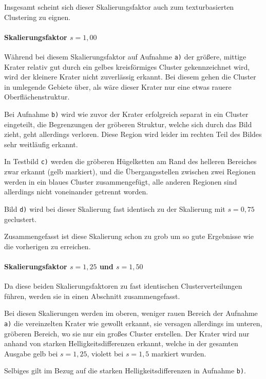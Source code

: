 Insgesamt scheint sich dieser Skalierungsfaktor auch zum texturbasierten Clustering zu eignen.

\paragraph{Skalierungsfaktor $s=1,00$}

Während bei diesem Skalierungsfaktor auf Aufnahme \texttt{a)} der größere, mittige Krater relativ gut durch ein gelbes kreisförmiges Cluster gekennzeichnet wird, wird der kleinere Krater nicht zuverlässig erkannt. Bei diesem gehen die Cluster in umlegende Gebiete über, als wäre dieser Krater nur eine etwas rauere Oberflächenstruktur.

Bei Aufnahme \texttt{b)} wird wie zuvor der Krater erfolgreich separat in ein Cluster eingeteilt, die Begrenzungen der gröberen Struktur, welche sich durch das Bild zieht, geht allerdings verloren. Diese Region wird leider im rechten Teil des Bildes sehr weitläufig erkannt.

In Testbild \texttt{c)} werden die gröberen Hügelketten am Rand des helleren Bereiches zwar erkannt (gelb markiert), und die Übergangsstellen zwischen zwei Regionen werden in ein blaues Cluster zusammengefügt, alle anderen Regionen sind allerdings nicht voneinander getrennt worden.

Bild \texttt{d)} wird bei dieser Skalierung fast identisch zu der Skalierung mit $s=0,75$ geclustert.

Zusammengefasst ist diese Skalierung schon zu grob um so gute Ergebnisse wie die vorherigen zu erreichen.

\paragraph{Skalierungsfaktor $s=1,25$ und $s=1,50$}

Da diese beiden Skalierungsfaktoren zu fast identischen Clusterverteilungen führen, werden sie in einen Abschnitt zusammengefasst.

Bei diesen Skalierungen werden im oberen, weniger rauen Bereich der Aufnahme \texttt{a)} die vereinzelten Krater wie gewollt erkannt, sie versagen allerdings im unteren, gröberen Bereich, wo sie nur ein großes Cluster erstellen. Der Krater wird nur anhand von starken Helligkeitsdifferenzen erkannt, welche in der gesamten Ausgabe gelb bei $s=1,25$, \bzw violett bei $s=1,5$ markiert wurden. 

Selbiges gilt im Bezug auf die starken Helligkeitsdifferenzen in Aufnahme \texttt{b)}.

